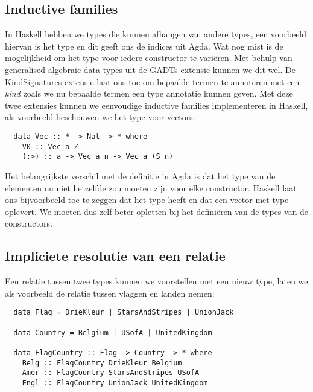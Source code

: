 \subsection{Inductive families}

In Haskell hebben we types die kunnen afhangen van andere types, een
voorbeeld hiervan is het  type en dit geeft ons de indices uit
Agda. Wat nog mist is de mogelijkheid om het type voor iedere constructor te
variëren. Met behulp van generalised algebraic data types \cite{gadts} uit de
GADTs extensie kunnen we dit wel. De KindSignatures extensie laat ons toe om
bepaalde termen te annoteren met een \emph{kind} zoals we nu bepaalde termen
een type annotatie kunnen geven. Met deze twee extensies kunnen we eenvoudige
inductive families implementeren in Haskell, als voorbeeld beschouwen we het
type voor vectors:

\begin{verbatim}
  data Vec :: * -> Nat -> * where
    V0 :: Vec a Z
    (:>) :: a -> Vec a n -> Vec a (S n)
\end{verbatim}

Het belangrijkste verschil met de definitie in Agda is dat het type van de
elementen nu niet hetzelfde zou moeten zijn voor elke constructor. Haskell laat
ons bijvoorbeeld toe te zeggen dat  het type  heeft
en dat \ihask{(:>)} een vector met type  oplevert. We
moeten dus zelf beter opletten bij het definiëren van de types van de
constructors.

\subsection{Impliciete resolutie van een relatie}

Een relatie tussen twee types kunnen we voorstellen met een nieuw type, laten
we als voorbeeld de relatie tussen vlaggen en landen nemen:

\begin{verbatim}
  data Flag = DrieKleur | StarsAndStripes | UnionJack

  data Country = Belgium | USofA | UnitedKingdom

  data FlagCountry :: Flag -> Country -> * where
    Belg :: FlagCountry DrieKleur Belgium
    Amer :: FlagCountry StarsAndStripes USofA
    Engl :: FlagCountry UnionJack UnitedKingdom
\end{verbatim}

